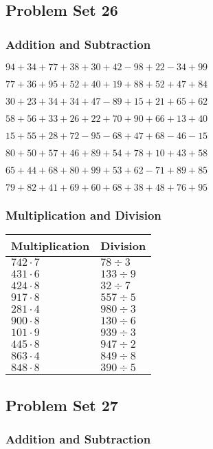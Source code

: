 \hypertarget{problem-set-26}{%
\subsection{Problem Set 26}\label{problem-set-26}}

\hypertarget{addition-and-subtraction-25}{%
\subsubsection{Addition and
Subtraction}\label{addition-and-subtraction-25}}

\(94+34+77+38+30+42-98+22-34+99\)

\(77+36+95+52+40+19+88+52+47+84\)

\(30+23+34+34+47-89+15+21+65+62\)

\(58+56+33+26+22+70+90+66+13+40\)

\(15+55+28+72-95-68+47+68-46-15\)

\(80+50+57+46+89+54+78+10+43+58\)

\(65+44+68+80+99+53+62-71+89+85\)

\(79+82+41+69+60+68+38+48+76+95\)

\hypertarget{multiplication-and-division-25}{%
\subsubsection{Multiplication and
Division}\label{multiplication-and-division-25}}

\begin{longtable}[]{@{}ll@{}}
\toprule
Multiplication & Division\tabularnewline
\midrule
\endhead
\(742\cdot7\) & \(78÷3\)\tabularnewline
\(431\cdot6\) & \(133÷9\)\tabularnewline
\(424\cdot8\) & \(32÷7\)\tabularnewline
\(917\cdot8\) & \(557÷5\)\tabularnewline
\(281\cdot4\) & \(980÷3\)\tabularnewline
\(900\cdot8\) & \(130÷6\)\tabularnewline
\(101\cdot9\) & \(939÷3\)\tabularnewline
\(445\cdot8\) & \(947÷2\)\tabularnewline
\(863\cdot4\) & \(849÷8\)\tabularnewline
\(848\cdot8\) & \(390÷5\)\tabularnewline
\bottomrule
\end{longtable}

\hypertarget{problem-set-27}{%
\subsection{Problem Set 27}\label{problem-set-27}}

\hypertarget{addition-and-subtraction-26}{%
\subsubsection{Addition and
Subtraction}\label{addition-and-subtraction-26}}

